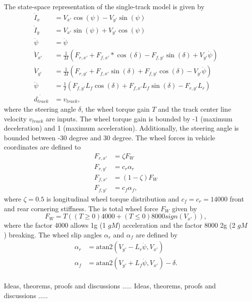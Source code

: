 \documentclass[letterpaper, 10 pt, conference]{ieeeconf}  %
\begin{document}
The state-space representation of the single-track model is given by
\begin{align}
\dot{I}_x &= V_{x'} \cos(\psi) - V_{y'} \sin(\psi)\\
\dot{I}_y &= V_{x'} \sin(\psi) + V_{y'} \cos(\psi)\\
\dot{\psi} &= \dot{\psi}\\
\dot{V}_{x'} &=  \frac{1}{M}  (F_{r,x'} + F_{f,x'}*\cos(\delta) - F_{f,y'} \sin(\delta) + V_{y'}\dot{\psi})\\
\dot{V}_{y'} &=  \frac{1}{M}   (F_{r,y'} + F_{f,x'} \sin(\delta) + F_{f,y'} \cos(\delta) - V_{y'} \dot{\psi})\\
\ddot{\psi} &= \frac{1}{I} (F_{f,y'} L_f \cos(\delta) + F_{f,x'} L_f \sin(\delta) - F_{r,y'} L_r)\\
\dot{d_{track}} &= v_{track},
\end{align}
where the steering angle $\delta$, the wheel torque gain $T$ and the track center line velocity $v_{track}$ are inputs. The wheel torque gain is bounded by -1 (maximum deceleration) and 1 (maximum acceleration). Additionally, the steering angle is bounded between -30 degree and 30 degree.
The wheel forces in vehicle coordinates are defined to
\begin{align}
 F_{r,x'} &= \zeta  F_W\\
 F_{r,y'} &= c_r \alpha_r \\
 F_{f,x'} &= (1-\zeta)  F_W\\
 F_{f,y'} &= c_f  \alpha_f, 
\end{align}
where $\zeta=0.5$ is longitudinal wheel torque distribution and $c_f =c_r=14000$ front  and rear cornering stiffness. The is total wheel force $F_W$ given by
\begin{equation}
F_W = T  ( (T\geq0) 4000+(T\leq0) 8000 sign(V_{x'}) ),
\end{equation}
where the factor 4000 allows 1g (1 $g M$) acceleration and the factor 8000 2g (2 $g M$) breaking.
The wheel slip angles $\alpha_r$ and $\alpha_f$ are defined by
\begin{align}
\alpha_r &= \text{atan2}(V_{y'}-L_r \dot{\psi},V_{x'})\\
\alpha_f &= \text{atan2}(V_{y'}+L_f \dot{\psi},V_{x'}) - \delta.
\end{align}
 \\
Ideas, theorems, proofs and discussions .....
Ideas, theorems, proofs and discussions .....



\end{document}
